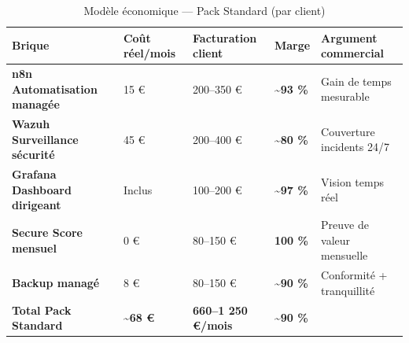\begin{table}[htbp]
  \centering
  \caption{Modèle économique — Pack Standard (par client)}
  \renewcommand{\arraystretch}{1.5}
  \begin{tabularx}{\textwidth}{>{\bfseries}X p{2.4cm} p{2.6cm} p{1.4cm} p{3cm}}
    \toprule
    \rowcolor{tabheader}
    \color{white}Brique & \color{white}Coût réel/mois & \color{white}Facturation client & \color{white}Marge & \color{white}Argument commercial \\
    \midrule
    n8n Automatisation managée & 15 € & 200–350 € & \textcolor{colgreen}{\textbf{\~{}93 \%}} & Gain de temps mesurable \\
    \rowcolor{rowgray}
    Wazuh Surveillance sécurité & 45 € & 200–400 € & \textcolor{colgreen}{\textbf{\~{}80 \%}} & Couverture incidents 24/7 \\
    Grafana Dashboard dirigeant & Inclus & 100–200 € & \textcolor{colgreen}{\textbf{\~{}97 \%}} & Vision temps réel \\
    \rowcolor{rowgray}
    Secure Score mensuel & 0 € & 80–150 € & \textcolor{colgreen}{\textbf{100 \%}} & Preuve de valeur mensuelle \\
    Backup managé & 8 € & 80–150 € & \textcolor{colgreen}{\textbf{\~{}90 \%}} & Conformité + tranquillité \\
    \midrule
    \rowcolor{navydark}
    \color{white}\textbf{Total Pack Standard} & \color{white}\textbf{\~{}68 €} & \color{white}\textbf{660–1 250 €/mois} & \color{white}\textbf{\~{}90 \%} & \\
    \bottomrule
  \end{tabularx}
\end{table}

